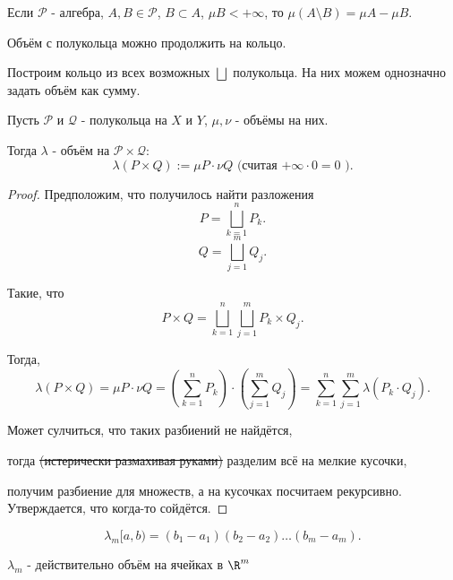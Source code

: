 \begin{remark} \thmslashn

    Если $\mathcal{P}$ - алгебра, $A, B\in \mathcal{P}$, $B \subset A$, $\mu B < +\infty$, то $\mu (A \setminus B) = \mu A - \mu B$. 
\end{remark}
\begin{remark} \thmslashn

    Объём с полукольца можно продолжить на кольцо.

    Построим кольцо из всех возможных $\bigsqcup$ полукольца. На них можем однозначно задать объём как сумму.
\end{remark}
\begin{theorem} \thmslashn

    Пусть $\mathcal{P}$ и $\mathcal{Q}$ - полукольца на $X$ и $Y$, $\mu, \nu$ - объёмы на них.

    Тогда $\lambda$ - объём на $\mathcal{P} \times \mathcal{Q}$:
    \[ \lambda(P \times Q) := \mu P \cdot \nu Q \text{ (считая $+\infty \cdot 0 = 0$ )}.\]

    \begin{proof} \thmslashn
   
        Предположим, что получилось найти разложения
        \[ P = \bigsqcup\limits_{k=1}^{n} P_{k} .\]
        \[ Q = \bigsqcup\limits_{j=1}^{m} Q_{j} .\]

        Такие, что 
        \[ P \times Q = \bigsqcup\limits_{k=1}^{n} \bigsqcup\limits_{j=1}^{m} P_{k} \times Q_{j} .\] 

        Тогда,
       \[ \lambda(P \times Q) = \mu P \cdot \nu Q = \left(\sum\limits_{k=1}^{n} P_{k}\right) \cdot \left( \sum\limits_{j=1}^{m} Q_{j} \right) = \sum\limits_{k=1}^{n} \sum\limits_{j=1}^{m} \lambda(P_{k} \cdot Q_{j}).\]

       Может сулчиться, что таких разбиений не найдётся,
       
       тогда \sout{(истерически размахивая руками)} разделим всё на мелкие кусочки,
       
       получим разбиение для множеств, а на кусочках посчитаем рекурсивно. Утверждается, что когда-то сойдётся.
    \end{proof}
\end{theorem}
\begin{consequence} \thmslashn

    \[ \lambda_{m} [a, b) = (b_1 - a_1)(b_2 - a_2) \ldots (b_{m} - a_{m}) .\]

    $\lambda_{m}$ - действительно объём на ячейках в $\R^{m}$
\end{consequence}

